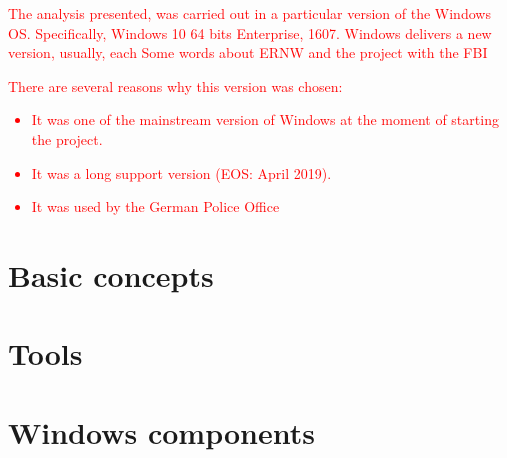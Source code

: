 
\textcolor{red}{The analysis presented, was carried out in a particular version of the Windows OS. Specifically, Windows 10 64 bits Enterprise, 1607. Windows delivers a new version, usually, each 
Some words about ERNW and the project with the FBI}

\textcolor{red}{There are several reasons why this version was chosen:
\begin{itemize}
    \item It was one of the mainstream version of Windows at the moment of starting the project.
    \item It was a long support version (EOS: April 2019).
    \item It was used by the German Police Office
\end{itemize}
}
\section{Basic concepts}
    

\section{Tools}
    

\section{Windows components}
    

